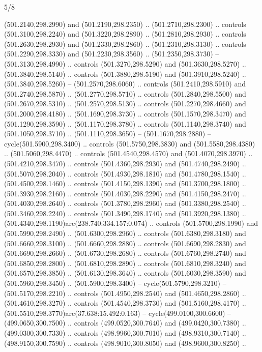 \begin{flagdescription}{5/8}
\begin{scope}[xshift=0.5\flaglength,yshift=0.5\flagwidth,scale=\flagwidth/475.63]
\begin{scope}[y=0.8pt, x=0.8pt, yscale=-1, xscale=1,shift={(-450,-300)}]
\begin{scope}[cm={{1.0,0.0,0.0,1.0,(-0.0002,0.12556)}},cm={{1.0,0.0,0.0,1.0,(0.00179,0.0)}}]
\begin{scope}[cm={{1.11592,0.0,0.0,1.11592,(-106.89933,-41.77764)}}]
\begin{scope}[draw=black,fill=cfff]
\begin{scope}[fill=black]
  (501.2140,298.2990) and (501.2190,298.2350) .. (501.2710,298.2300) .. controls
  (501.3100,298.2240) and (501.3220,298.2890) .. (501.2810,298.2930) .. controls
  (501.2630,298.2930) and (501.2330,298.2860) .. (501.2310,298.3130) .. controls
  (501.2290,298.3330) and (501.2230,298.3560) .. (501.2350,298.3730) --
  (501.3130,298.4990) .. controls (501.3270,298.5290) and (501.3630,298.5270) ..
  (501.3840,298.5140) .. controls (501.3880,298.5190) and (501.3910,298.5240) ..
  (501.3840,298.5260) -- (501.2570,298.6060) .. controls (501.2410,298.5910) and
  (501.2740,298.5870) .. (501.2770,298.5710) .. controls (501.2840,298.5500) and
  (501.2670,298.5310) .. (501.2570,298.5130) .. controls (501.2270,298.4660) and
  (501.2000,298.4180) .. (501.1690,298.3730) .. controls (501.1570,298.3470) and
  (501.1290,298.3590) .. (501.1170,298.3780) .. controls (501.1140,298.3740) and
  (501.1050,298.3710) .. (501.1110,298.3650) -- (501.1670,298.2880) --
  cycle(501.5900,298.3400) .. controls (501.5750,298.3830) and
  (501.5580,298.4380) .. (501.5060,298.4470) .. controls (501.4540,298.4570) and
  (501.4070,298.3970) .. (501.4210,298.3470) .. controls (501.4360,298.2930) and
  (501.4740,298.2490) .. (501.5070,298.2040) .. controls (501.4930,298.1810) and
  (501.4780,298.1540) .. (501.4500,298.1460) .. controls (501.4150,298.1390) and
  (501.3700,298.1800) .. (501.3930,298.2160) .. controls (501.4030,298.2290) and
  (501.4150,298.2470) .. (501.4030,298.2640) .. controls (501.3780,298.2960) and
  (501.3380,298.2540) .. (501.3460,298.2240) .. controls (501.3490,298.1740) and
  (501.3920,298.1380) .. (501.4340,298.1190)arc(238.740:334.157:0.074) ..
  controls (501.5700,298.1990) and (501.5990,298.2490) .. (501.6300,298.2960) ..
  controls (501.6380,298.3180) and (501.6660,298.3100) .. (501.6660,298.2880) ..
  controls (501.6690,298.2830) and (501.6690,298.2660) .. (501.6730,298.2680) ..
  controls (501.6760,298.2740) and (501.6850,298.2800) .. (501.6810,298.2890) ..
  controls (501.6810,298.3240) and (501.6570,298.3850) .. (501.6130,298.3640) ..
  controls (501.6030,298.3590) and (501.5960,298.3450) .. (501.5900,298.3400) --
  cycle(501.5790,298.3210) -- (501.5170,298.2210) .. controls
  (501.4950,298.2540) and (501.4650,298.2860) .. (501.4610,298.3270) .. controls
  (501.4540,298.3730) and (501.5160,298.4170) ..
  (501.5510,298.3770)arc(37.638:15.492:0.163) -- cycle(499.0100,300.6600) --
  (499.0650,300.7500) .. controls (499.0520,300.7640) and (499.0420,300.7380) ..
  (499.0300,300.7330) .. controls (498.9960,300.7010) and (498.9310,300.7140) ..
  (498.9150,300.7590) .. controls (498.9010,300.8050) and (498.9600,300.8250) ..

\end{scope}
\end{scope}
\end{scope}
\end{scope}
\end{scope}
\end{scope}
\end{flagdescription}
